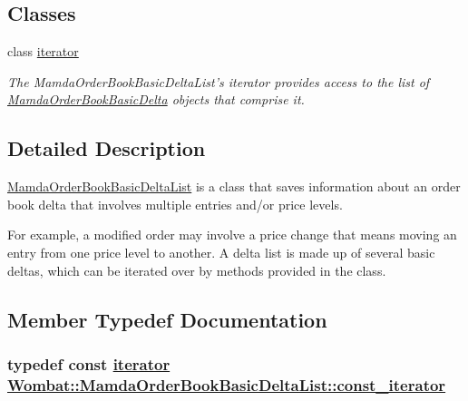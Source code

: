\subsection*{Classes}
\begin{CompactItemize}
\item 
class \hyperlink{classWombat_1_1MamdaOrderBookBasicDeltaList_1_1iterator}{iterator}
\begin{CompactList}\small\item\em The Mamda\-Order\-Book\-Basic\-Delta\-List's iterator provides access to the list of \hyperlink{classWombat_1_1MamdaOrderBookBasicDelta}{Mamda\-Order\-Book\-Basic\-Delta} objects that comprise it. \item\end{CompactList}\end{CompactItemize}


\subsection{Detailed Description}
\hyperlink{classWombat_1_1MamdaOrderBookBasicDeltaList}{Mamda\-Order\-Book\-Basic\-Delta\-List} is a class that saves information about an order book delta that involves multiple entries and/or price levels. 

For example, a modified order may involve a price change that means moving an entry from one price level to another. A delta list is made up of several basic deltas, which can be iterated over by methods provided in the class. 



\subsection{Member Typedef Documentation}
\hypertarget{classWombat_1_1MamdaOrderBookBasicDeltaList_e039c234de2127a8451a298849cc6c69}{
\subsubsection[const\_\-iterator]{\setlength{\rightskip}{0pt plus 5cm}typedef const \hyperlink{classWombat_1_1MamdaOrderBookBasicDeltaList_1_1iterator}{iterator} \hyperlink{classWombat_1_1MamdaOrderBookBasicDeltaList_1_1iterator}{Wombat::Mamda\-Order\-Book\-Basic\-Delta\-List::const\_\-iterator}}}
\label{classWombat_1_1MamdaOrderBookBasicDeltaList_e039c234de2127a8451a298849cc6c69}




